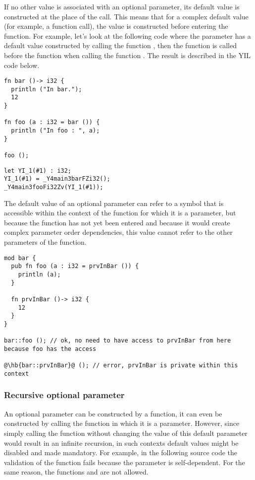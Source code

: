 If no other value is associated with an optional parameter, its default value is
constructed at the place of the call. This means that for a complex default
value (for example, a function call), the value is constructed before entering
the function. For example, let's look at the following code where the parameter
 has a default value constructed by calling the function ,
then the function  is called before the function  when
calling the function . The result is described in the YIL code
below.

\begin{lstlisting}[style=coloredverbatim]
fn bar ()-> i32 {
  println ("In bar.");
  12
}

fn foo (a : i32 = bar ()) {
  println ("In foo : ", a);
}

foo ();
\end{lstlisting}

\begin{lstlisting}[style=lyilVerb]
let YI_1(#1) : i32;
YI_1(#1) = _Y4main3barFZi32();
_Y4main3fooFi32Zv(YI_1(#1));
\end{lstlisting}

The default value of an optional parameter can refer to a symbol that is
accessible within the context of the function for which it is a parameter, but
because the function has not yet been entered and because it would create
complex parameter order dependencies, this value cannot refer to the other
parameters of the function.

\begin{lstlisting}[style=coloredverbatim, escapechar=@]
mod bar {
  pub fn foo (a : i32 = prvInBar ()) {
    println (a);
  }

  fn prvInBar ()-> i32 {
    12
  }
}

bar::foo (); // ok, no need to have access to prvInBar from here because foo has the access

@\hb{bar::prvInBar}@ (); // error, prvInBar is private within this context
\end{lstlisting}

\subsubsection*{Recursive optional parameter}

An optional parameter can be constructed by a function, it can even be
constructed by calling the function in which it is a parameter. However, since
simply calling the function without changing the value of this default parameter
would result in an infinite recursion, in such contexts default values might be
disabled and made mandatory. For example, in the following source code the
validation of the function  fails because the parameter 
is self-dependent. For the same reason, the functions  and
 are not allowed.

